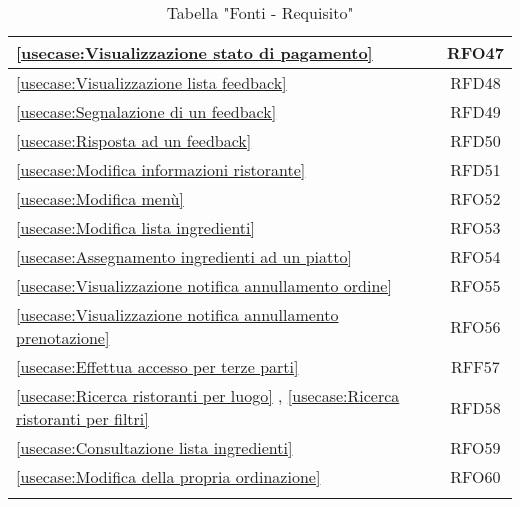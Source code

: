 \begin{longtable}{|l|c|}
	\hline
	\autoref{usecase:Visualizzazione stato di pagamento}                                                                                                         & RFO47                  \\
	\hline
	\autoref{usecase:Visualizzazione lista feedback}                                                                                                             & RFD48                  \\
	\hline
	\autoref{usecase:Segnalazione di un feedback}                                                                                                                & RFD49                  \\
	\hline
	\autoref{usecase:Risposta ad un feedback}                                                                                                                    & RFD50                  \\
	\hline
	\autoref{usecase:Modifica informazioni ristorante}                                                                                                           & RFD51                  \\
	\hline
	\autoref{usecase:Modifica menù}                                                                                                                              & RFO52                  \\
	\hline
	\autoref{usecase:Modifica lista ingredienti}                                                                                                                 & RFO53                  \\
	\hline
	\autoref{usecase:Assegnamento ingredienti ad un piatto}                                                                                                      & RFO54                  \\
	\hline
	\autoref{usecase:Visualizzazione notifica annullamento ordine}                                                                                               & RFO55                  \\
	\hline
	\autoref{usecase:Visualizzazione notifica annullamento prenotazione}                                                                                         & RFO56				\\
	\hline
	\autoref{usecase:Effettua accesso per terze parti} 																											&RFF57                  \\
	\hline
	\autoref{usecase:Ricerca ristoranti per luogo} , \autoref{usecase:Ricerca ristoranti per filtri}															&RFD58                  \\
	\hline
	\autoref{usecase:Consultazione lista ingredienti} 																											&RFO59                  \\
	\hline
	\autoref{usecase:Modifica della propria ordinazione}																										&RFO60                  \\
	\caption{Tabella "Fonti - Requisito"}
\end{longtable}



